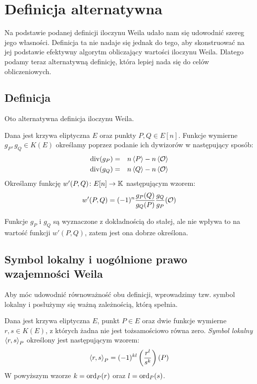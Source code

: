 \section{Definicja alternatywna}

Na podstawie podanej definicji iloczynu Weila
udało nam się udowodnić szereg jego własności.
Definicja ta nie nadaje się jednak do tego,
aby skonstruować na jej podstawie
efektywny algorytm obliczający wartości iloczynu Weila.
Dlatego podamy teraz alternatywną definicję,
która lepiej nada się do celów obliczeniowych.

\subsection*{Definicja}

Oto alternatywna definicja iloczynu Weila.

\begin{definition}
Dana jest krzywa eliptyczna $E$ oraz punkty $P, Q \in E[n]$.
Funkcje wymierne $g_P, g_Q \in K(E)$
określamy poprzez podanie ich dywizorów
w następujący sposób:
\begin{eqnarray*}
\operatorname{div}(g_P) & = & n\left\langle P\right\rangle - n\left\langle\mathcal{O}\right\rangle \\
\operatorname{div}(g_Q) & = & n\left\langle Q\right\rangle - n\left\langle\mathcal{O}\right\rangle
\end{eqnarray*}
Określamy funkcję $w'(P, Q)\colon E[n] \to \mathbb{K}$
następującym wzorem:
\begin{equation}\label{weil_pairing_alt_eqn}
w'(P, Q) = (-1)^n\frac{g_P(Q)}{g_Q(P)}\frac{g_Q}{g_P}(\mathcal{O})
\end{equation}
\end{definition}

\begin{remark}
Funkcje $g_P$ i $g_Q$ są wyznaczone z dokładnością do stałej,
ale nie wpływa to na wartość funkcji $w'(P, Q)$,
zatem jest ona dobrze określona.
\end{remark}

\subsection*{Symbol lokalny i uogólnione prawo wzajemności Weila}

Aby móc udowodnić równoważność obu definicji,
wprowadzimy tzw. symbol lokalny
i posłużymy się ważną zależnością, którą spełnia.

\begin{definition}
Dana jest krzywa eliptyczna $E$, punkt $P \in E$
oraz dwie funkcje wymierne $r, s \in K(E)$,
z których żadna nie jest tożsamościowo równa zero.
\emph{Symbol lokalny $\left\langle r , s \right\rangle_{P}$}
określony jest następującym wzorem:
\begin{equation}
\left\langle r , s \right\rangle_{P} = (-1)^{kl}\left(\frac{r^l}{s^k}\right)(P)
\end{equation}
W powyższym wzorze $k = \operatorname{ord}_P(r)$ oraz $l = \operatorname{ord}_P(s)$.
\end{definition}

